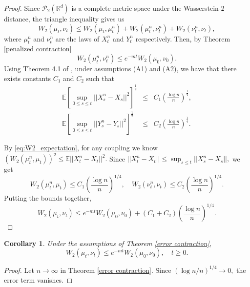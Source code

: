 \documentclass[amsfonts, reqno]{amsart}
\newtheorem{cor}[thm]{Corollary}
\theoremstyle{definition}
\theoremstyle{remark}
\newcommand{\bbR}{\mathbb{R}}
\numberwithin{equation}{section}
\begin{document}
\begin{proof}
    Since $\mathcal{P}_2(\bbR^d)$ is a complete metric space under the Wasserstein-2 distance, the triangle inequality gives us \[
    W_2(\mu_t, \nu_t) \leq W_2(\mu_t, \mu_t^n) + W_2(\mu_t^n, \nu_t^n) + W_2(\nu_t^n, \nu_t),
    \]
    where $\mu_t^n$ and $\nu_t^n$ are the laws of $X_t^n$ and $Y_t^n$ respectively. Then, by Theorem \ref{penalized contraction} \[
    W_2(\mu_t^n, \nu_t^n) \leq e^{-mt}W_2(\mu_0, \nu_0).
    \]
    Using Theorem 4.1 of \cite{slominski2013}, under assumptions (A1) and (A2), we have that there exists constants $C_1$ and $C_2$ such that \begin{eqnarray*}
        \mathbb{E}\left[\sup_{0 \leq s \leq t} ||X_s^n -X_s||^2\right]^{\frac{1}{2}}  &\leq& C_1 \left(\frac{\log n}{n}\right)^{\frac{1}{4}}, \\ \mathbb{E}\left[\sup_{0 \leq s \leq t} ||Y_s^n -Y_s||^2\right]^{\frac{1}{2}}  &\leq& C_2 \left(\frac{\log n}{n}\right)^{\frac{1}{4}}.
    \end{eqnarray*}
    
    By \eqref{eq:W2_expectation}, for any coupling we know $(W_2(\mu_t^n, \mu_t))^2 \leq \mathbb{E}||X_t^n - X_t||^2.$ Since $||X_t^n - X_t|| \leq \sup_{s\leq t}||X_s^n - X_s||,$ we get \[
    W_2(\mu_t^n, \mu_t) \leq C_1 \left( \frac{\log n}{n} \right)^{1/4}, \quad W_2(\nu_t^n, \nu_t) \leq C_2 \left( \frac{\log n}{n} \right)^{1/4}.
    \]
    Putting the bounds together, \begin{equation*}
        W_2(\mu_t, \nu_t) \leq e^{-mt}W_2(\mu_0, \nu_0) + (C_1 + C_2)\left( \frac{\log n}{n} \right)^{1/4}.
    \end{equation*}
\end{proof}

\begin{cor}
    Under the assumptions of Theorem \ref{error contraction}, \begin{equation*}
        W_2(\mu_t, \nu_t) \leq e^{-mt}W_2(\mu_0, \nu_0), \quad t \geq 0.
    \end{equation*}
\end{cor}

\begin{proof}
    Let $n \to \infty$ in Theorem \ref{error contraction}. Since $(\log n/n)^{1/4} \to 0,$ the error term vanishes.
\end{proof}
\end{document}
